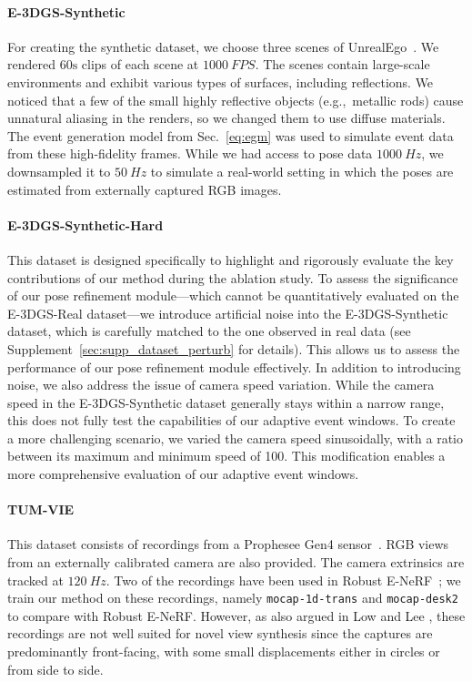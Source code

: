 \paragraph{E-3DGS-Synthetic}
For creating the synthetic dataset, we choose three scenes of UnrealEgo~\cite{unrealego}.
We rendered $60\unit{\second}$ clips of each scene at $\qty{1000}{FPS}$.
The scenes contain large-scale environments and exhibit various types of surfaces, including reflections.
We noticed that a few of the small highly reflective objects (e.g.,~metallic rods) cause unnatural aliasing in the renders, so we changed them to use diffuse materials. The event generation model from Sec.~\ref{eq:egm} was used to simulate event data from these high-fidelity frames. 
While we had access to pose data $\qty{1000}{Hz}$, we downsampled it to $\qty{50}{Hz}$ to simulate a real-world setting in which the poses are estimated from externally captured RGB images. 

\paragraph{E-3DGS-Synthetic-Hard}
This dataset is designed specifically to highlight and rigorously evaluate the key contributions of our method during the ablation study.
To assess the significance of our pose refinement module---which cannot be quantitatively evaluated on the E-3DGS-Real dataset---we introduce artificial noise into the E-3DGS-Synthetic dataset, which is carefully matched to the one observed in real data (see Supplement~\ref{sec:supp_dataset_perturb} for details). This allows us to assess the performance of our pose refinement module effectively. 
In addition to introducing noise, we also address the issue of camera speed variation. While the camera speed in the E-3DGS-Synthetic dataset generally stays within a narrow range, this does not fully test the capabilities of our adaptive event windows. To create a more challenging scenario, we varied the camera speed sinusoidally, with a ratio between its maximum and minimum speed of 100. This modification enables a more comprehensive evaluation of our adaptive event windows.


\paragraph{TUM-VIE}
This dataset consists of recordings from a Prophesee Gen4 sensor~\cite{klenk2021tum}. RGB views from an externally calibrated camera are also provided. The camera extrinsics are tracked at $\qty{120}{Hz}$. Two of the recordings have been used in Robust E-NeRF~\cite{robust_enerf}; we train our method on these recordings, namely \texttt{mocap-1d-trans} and \texttt{mocap-desk2} to compare with Robust E-NeRF. However, as also argued in Low and Lee \cite{robust_enerf}, these recordings are not well suited for novel view synthesis since the captures are predominantly front-facing, with some small displacements either in circles or from side to side. 

